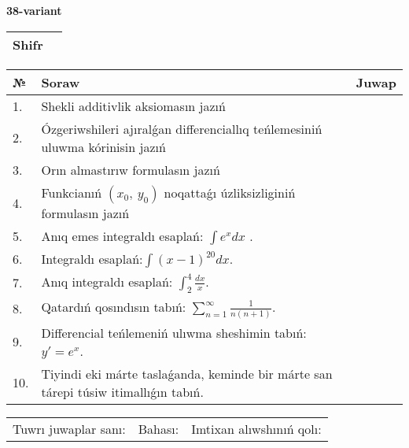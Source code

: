 \documentclass{article}
\begin{document}
  \egroup
  
  \newpage
  
  
  \textbf{38-variant}\\
  
  \bgroup
  \def\arraystretch{1.6} %
  
  \begin{tabular}{|m{5.7cm}|m{9.5cm}|}
  \hline
  Shifr & \\
  \hline
  \end{tabular}
  
  \vspace{1cm}
  
  \begin{tabular}{|m{0.7cm}|m{10cm}|m{4cm}|}
  \hline
  № & Soraw & Juwap \\
  \hline
  1. & Shekli additivlik aksiomasın jazıń &  \\
  \hline
  2. & Ózgeriwshileri ajıralǵan differenciallıq teńlemesiniń uluwma kórinisin jazıń &  \\
  \hline
  3. & Orın almastırıw formulasın jazıń &  \\
  \hline
  4. & Funkcianıń \((x_{0},\ y_{0})\) noqattaǵı úzliksizliginiń formulasın jazıń &  \\
  \hline
  5. & Anıq emes integraldı esaplań: \(\int{e^{x}dx}\) . &  \\
  \hline
  6. & Integraldı esaplań:\(\int{(x - 1)^{20}}dx\). &  \\
  \hline
  7. & Anıq integraldı esaplań: \(\int_{2}^{4}\frac{dx}{x}\). &  \\
  \hline
  8. & Qatardıń qosındısın tabıń: \(\sum_{n = 1}^{\infty}\frac{1}{n(n + 1)}\). &  \\
  \hline
  9. & Differencial teńlemeniń ulıwma sheshimin tabıń: \(y' = e^{x}\). &  \\
  \hline
  10. & Tiyindi eki márte taslaǵanda, keminde bir márte san tárepi túsiw itimallıǵın tabıń. &  \\
  \hline
  \end{tabular}
  
  \vspace{1cm}
  
  \begin{tabular}{lll}
  Tuwrı juwaplar sanı: \underline{\hspace{1.5cm}} & 
  Bahası: \underline{\hspace{1.5cm}} & 
  Imtixan alıwshınıń qolı: \underline{\hspace{2cm}} \\
  \end{tabular}
  
\end{document}
